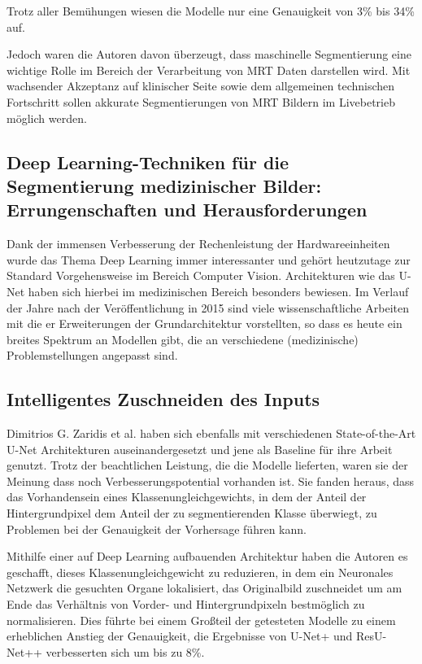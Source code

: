 Trotz aller Bemühungen wiesen die Modelle nur eine Genauigkeit von 3\% bis 34\% auf. \citet{Clarke:Mri1995}

Jedoch waren die Autoren davon überzeugt, dass maschinelle Segmentierung eine wichtige Rolle im Bereich der Verarbeitung von MRT Daten darstellen wird. Mit wachsender Akzeptanz auf klinischer Seite sowie dem allgemeinen technischen Fortschritt sollen akkurate Segmentierungen von MRT Bildern im Livebetrieb möglich werden.

\newpage

\subsection{Deep Learning-Techniken für die Segmentierung medizinischer Bilder:
Errungenschaften und Herausforderungen}

Dank der immensen Verbesserung der Rechenleistung der Hardwareeinheiten wurde das Thema Deep Learning immer interessanter und gehört heutzutage zur Standard Vorgehensweise im Bereich Computer Vision. Architekturen wie das U-Net \citet{U-Net} haben sich hierbei im medizinischen Bereich besonders bewiesen. Im Verlauf der Jahre nach der Veröffentlichung in 2015 sind viele wissenschaftliche Arbeiten mit die er Erweiterungen der Grundarchitektur vorstellten, so dass es heute ein breites Spektrum an Modellen gibt, die an verschiedene (medizinische) Problemstellungen angepasst sind. \citet{Hesamian}

\subsection{Intelligentes Zuschneiden des Inputs}

Dimitrios G. Zaridis et al. \citet{SmartCrop} haben sich ebenfalls mit verschiedenen State-of-the-Art U-Net Architekturen auseinandergesetzt und jene als Baseline für ihre Arbeit genutzt. Trotz der beachtlichen Leistung, die die Modelle lieferten, waren sie der Meinung dass noch Verbesserungspotential vorhanden ist. Sie fanden heraus, dass das Vorhandensein eines Klassenungleichgewichts, in dem der Anteil der Hintergrundpixel dem Anteil der zu segmentierenden Klasse überwiegt, zu Problemen bei der Genauigkeit der Vorhersage führen kann. 

Mithilfe einer auf Deep Learning aufbauenden Architektur haben die Autoren es geschafft, dieses Klassenungleichgewicht zu reduzieren, in dem ein Neuronales Netzwerk die gesuchten Organe lokalisiert, das Originalbild zuschneidet um am Ende das Verhältnis von Vorder- und Hintergrundpixeln bestmöglich zu normalisieren. Dies führte bei einem Großteil der getesteten Modelle zu einem erheblichen Anstieg der Genauigkeit, die Ergebnisse von U-Net+ und ResU-Net++ verbesserten sich um bis zu 8\%.

